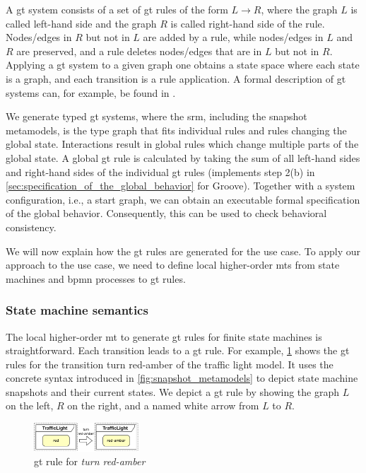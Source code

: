 \documentclass{jot}
\begin{document}
A \gls*{gt} system consists of a set of \gls*{gt} rules of the form $L \to R$, where the graph $L$ is called left-hand side and the graph $R$ is called right-hand side of the rule.
Nodes/edges in $R$ but not in $L$ are added by a rule, while nodes/edges in $L$ and $R$ are preserved, and a rule deletes nodes/edges that are in $L$ but not in $R$.
Applying a \gls*{gt} system to a given graph one obtains a state space where each state is a graph, and each transition is a rule application.
A formal description of \gls*{gt} systems can, for example, be found in \cite{ehrigFundamentalsAlgebraicGraph2006}. %

We generate typed \gls*{gt} systems, where the \gls*{srm}, including the snapshot metamodels, is the type graph that fits individual rules and rules changing the global state.
Interactions result in global rules which change multiple parts of the global state.
A global \gls*{gt} rule is calculated by taking the sum of all left-hand sides and right-hand sides of the individual \gls*{gt} rules (implements step 2(b) in \cref{sec:specification_of_the_global_behavior} for Groove).
Together with a system configuration, i.e., a start graph, we can obtain an executable formal specification of the global behavior.
Consequently, this can be used to check behavioral consistency.

We will now explain how the \gls*{gt} rules are generated for the use case.
To apply our approach to the use case, we need to define local higher-order \gls*{mt}s from state machines and \gls*{bpmn} processes to \gls*{gt} rules.


\subsubsection{State machine semantics}
The local higher-order \gls*{mt} to generate \gls*{gt} rules for finite state machines is straightforward.
Each transition leads to a \gls*{gt} rule.
For example, \cref{fig:sm_rule} shows the \gls*{gt} rules for the transition \textsf{turn red-amber} of the traffic light model.
It uses the concrete syntax introduced in \cref{fig:snapshot_metamodels} to depict state machine snapshots and their current states.
We depict a \gls*{gt} rule by showing the graph $L$ on the left, $R$ on the right, and a named white arrow from $L$ to $R$.

\begin{figure}[h]
    \centering
    \includegraphics[width=0.35\textwidth]{figures/sm_rule.pdf}
    \caption{\gls*{gt} rule for \emph{turn red-amber}}
    \label{fig:sm_rule}
\end{figure}
\end{document}
